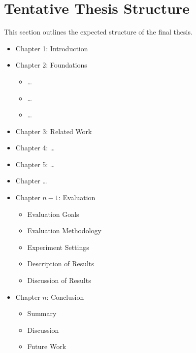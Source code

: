 
\chapter{Tentative Thesis Structure}

This section outlines the expected structure of the final thesis.

\begin{itemize}
	\item Chapter 1: Introduction
	\item Chapter 2: Foundations
		\begin{itemize}
			\item \ldots
			\item \ldots
			\item \ldots
		\end{itemize}
	\item Chapter 3: Related Work
	\item Chapter 4: \ldots
	\item Chapter 5: \ldots
	\item Chapter \ldots
	\item Chapter $n-1$: Evaluation
		\begin{itemize}
			\item Evaluation Goals
			\item Evaluation Methodology
			\item Experiment Settings
			\item Description of Results
			\item Discussion of Results
		\end{itemize}
	\item Chapter $n$: Conclusion
		\begin{itemize}
			\item Summary
			\item Discussion
			\item Future Work
		\end{itemize}
\end{itemize}
